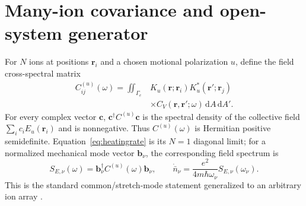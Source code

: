 \documentclass[aps,pra,twocolumn,superscriptaddress,longbibliography,nofootinbib,floatfix]{revtex4-2}
\theoremstyle{remark}
\newcommand{\dd}{\mathrm d}
\begin{document}
\section{Many-ion covariance and open-system generator}
\label{sec:opensystem}

For $N$ ions at positions $\bm r_i$ and a chosen motional polarization $u$, define the field cross-spectral matrix
\begin{align}
C^{(u)}_{ij}(\omega)=\iint_{\Gamma_e}&K_u(\bm r;\bm r_i)K_u^*(\bm r';\bm r_j)\nonumber\\
&\times C_V(\bm r,\bm r';\omega)\,\dd A\,\dd A'.
\label{eq:Cijgeneral}
\end{align}
For every complex vector $\bm c$, $\bm c^\dagger C^{(u)}\bm c$ is the spectral density of the collective field $\sum_i c_iE_u(\bm r_i)$ and is nonnegative.  Thus $C^{(u)}(\omega)$ is Hermitian positive semidefinite.  Equation~\eqref{eq:heatingrate} is its $N=1$ diagonal limit; for a normalized mechanical mode vector $\bm b_\nu$, the corresponding field spectrum is
\begin{equation}
S_{E,\nu}(\omega)=\bm b_\nu^\dagger C^{(u)}(\omega)\bm b_\nu,
\qquad
\dot{\bar n}_\nu=\frac{e^2}{4m\hbar\omega_\nu}S_{E,\nu}(\omega_\nu).
\label{eq:modeheatingmatrix}
\end{equation}
This is the standard common/stretch-mode statement generalized to an arbitrary ion array \cite{Brownnutt2015,Galve2017}.
\end{document}
